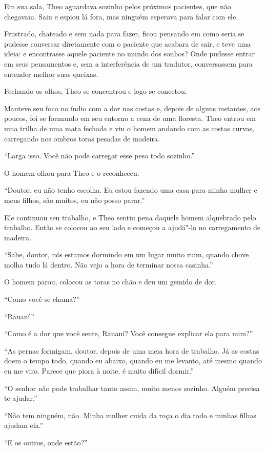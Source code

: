 Em sua sala, Theo aguardava sozinho pelos próximos pacientes, que
não chegavam. Saiu e espiou lá fora, mas ninguém esperava para
falar com ele.

Frustrado, chateado e sem nada para fazer, ficou pensando em como seria
se pudesse conversar diretamente com o paciente que acabara de sair, e
teve uma ideia: e encontrasse aquele paciente no mundo dos sonhos? Onde
pudesse entrar em seus pensamentos e, sem a interferência de um
tradutor, conversassem para entender melhor suas queixas.

Fechando os olhos, Theo se concentrou e logo se conectou.

Manteve seu foco no índio com a dor nas costas e, depois de alguns
instantes, aos poucos, foi se formando em seu entorno a cena de uma
floresta. Theo entrou em uma trilha de uma mata fechada e viu o homem
andando com as costas curvas, carregando nos ombros toras pesadas de
madeira.

``Larga isso. Você não pode carregar esse peso todo sozinho.''

O homem olhou para Theo e o reconheceu.

``Doutor, eu não tenho escolha. Eu estou fazendo uma casa para minha
mulher e meus filhos, são muitos, eu não posso parar.''

Ele continuou seu trabalho, e Theo sentiu pena daquele homem alquebrado
pelo trabalho. Então se colocou ao seu lado e começou a ajudá"-lo no
carregamento de madeira.

``Sabe, doutor, nós estamos dormindo em um lugar muito ruim, quando
chove molha tudo lá dentro. Não vejo a hora de terminar nossa casinha.''

O homem parou, colocou as toras no chão e deu um gemido de dor.

``Como você se chama?''

``Rauaní.''

``Como é a dor que você sente, Rauaní? Você consegue explicar ela para
mim?''

``As pernas formigam, doutor, depois de uma meia hora de trabalho. Já as
costas doem o tempo todo, quando eu abaixo, quando eu me levanto, até
mesmo quando eu me viro. Parece que piora à noite, é muito difícil
dormir.''

``O senhor não pode trabalhar tanto assim, muito menos sozinho. Alguém
precisa te ajudar.''

``Não tem ninguém, não. Minha mulher cuida da roça o dia todo e minhas
filhas ajudam ela.''

``E os outros, onde estão?''

